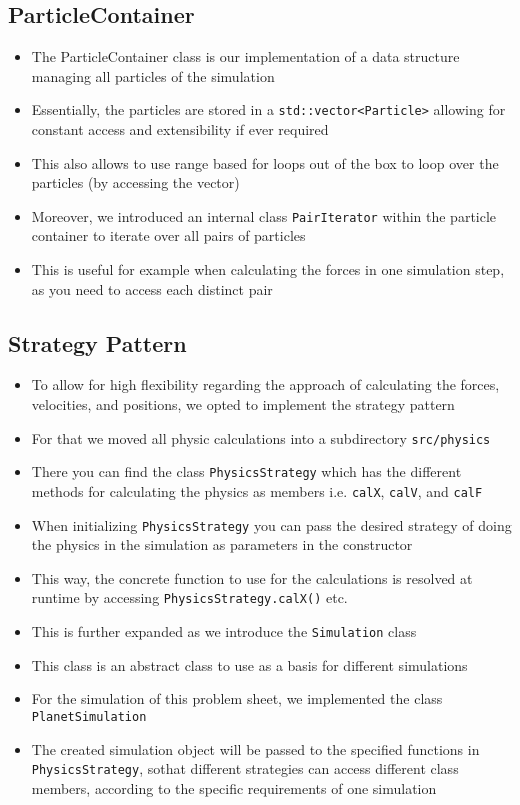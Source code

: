 \documentclass{article}
\begin{document}
\subsection{ParticleContainer}
\label{sec:Refactoring:ParticleContainer}
\begin{itemize}
    \item The ParticleContainer class is our implementation of a data structure managing all particles of the simulation
    \item Essentially, the particles are stored in a \verb|std::vector<Particle>| allowing for constant access and extensibility if ever required
    \item This also allows to use range based for loops out of the box to loop over the particles (by accessing the vector)
    \item Moreover, we introduced an internal class \verb|PairIterator| within the particle container to iterate over all pairs of particles
    \item This is useful for example when calculating the forces in one simulation step, as you need to access each distinct pair
\end{itemize}

\subsection{Strategy Pattern}
\begin{itemize}
    \item To allow for high flexibility regarding the approach of calculating the forces, velocities, and positions, we opted to implement the strategy pattern
    \item For that we moved all physic calculations into a subdirectory \verb|src/physics|
    \item There you can find the class \verb|PhysicsStrategy| which has the different methods for calculating the physics as members i.e. \verb|calX|, \verb|calV|, and \verb|calF|
    \item When initializing \verb|PhysicsStrategy| you can pass the desired strategy of doing the physics in the simulation as parameters in the constructor
    \item This way, the concrete function to use for the calculations is resolved at runtime by accessing \verb|PhysicsStrategy.calX()| etc.
    \item This is further expanded as we introduce the \verb|Simulation| class
    \item This class is an abstract class to use as a basis for different simulations
    \item For the simulation of this problem sheet, we implemented the class \verb|PlanetSimulation|
    \item The created simulation object will be passed to the specified functions in \verb|PhysicsStrategy|, sothat different strategies can access different class members, according to the specific requirements of one simulation
\end{itemize}
\end{document}
